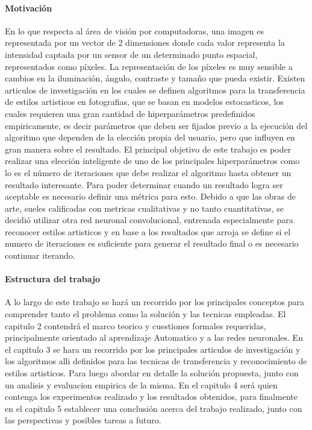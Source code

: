 \documentclass[a4paper,12pt,spanish]{book}
\begin{document}
  \paragraph{Motivación}
    En lo que respecta al área de visión por computadoras, una imagen es representada por un vector de 2 dimensiones donde cada valor representa la intensidad captada por un sensor 
    de un determinado punto espacial, representados como píxeles. La representación de los píxeles es muy sensible a cambios en la iluminación, ángulo, contraste y tamaño que pueda existir.
    Existen articulos de investigación en los cuales se definen algoritmos para la transferencia de estilos artisticos en fotografias, que se basan en modelos estocasticos, 
    los cuales requieren una gran cantidad de hiperparámetros predefinidos empiricamente, es decir parámetros que deben ser fijados previo a la ejecución del algoritmo que dependen 
    de la elección propia del usuario, pero que influyen en gran manera sobre el resultado.
    El principal objetivo de este trabajo es poder realizar una elección inteligente de uno de los principales hiperparámetros como lo es el número de iteraciones 
    que debe realizar el algoritmo hasta obtener un resultado interesante.
    Para poder determinar cuando un resultado logra ser aceptable es necesario definir una métrica para esto.
    Debido a que las obras de arte, sueles calificadas con metricas cualitativas y no tanto cuantitativas, se decidió utilizar otra red neuronal convolucional, 
    entrenada especialmente para reconocer estilos artisticos y en base a los resultados que arroja se define si el numero de iteraciones es suficiente para generar el resultado final 
    o es necesario continuar iterando.
  \paragraph{Estructura del trabajo}
    A lo largo de este trabajo se hará un recorrido por los principales conceptos para comprender tanto el problema como la solución y las tecnicas empleadas.
    El capitulo 2 contendrá el marco teorico y cuestiones formales requeridas, principalmente orientado al aprendizaje Automatico y a las redes neuronales.
    En el capitulo 3 se hara un recorrido por los principales articulos de investigación y los algoritmos alli definidos para las tecnicas de transferencia y reconocimiento de estilos artisticos.
    Para luego abordar en detalle la solución propuesta, junto con un analisis y evaluacion empirica de la misma.
    En el capitulo 4 será quien contenga los experimentos realizado y los resultados obtenidos, para finalmente en el capitulo 5 establecer una conclusión acerca del trabajo realizado, 
    junto con las perspectivas y posibles tareas a futuro.
\end{document}
